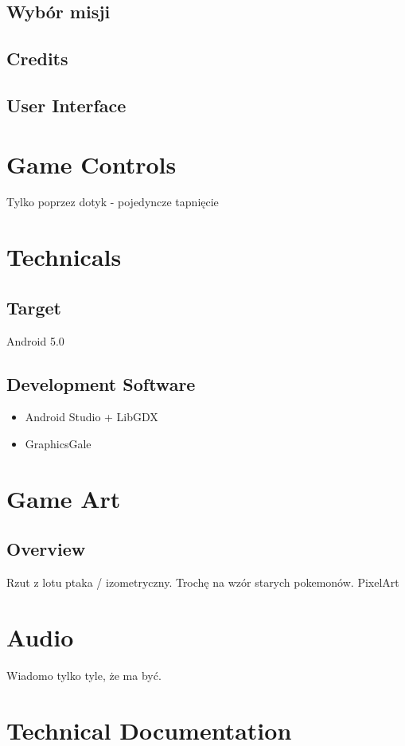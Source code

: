 \documentclass[12pt]{article}
\begin{document}
\subsection{Wybór misji}
\subsection{Credits}
\subsection{User Interface}

\newpage
\section{Game Controls}
Tylko poprzez dotyk - pojedyncze tapnięcie 

\newpage
\section{Technicals}
\subsection{Target}
Android 5.0
\subsection{Development Software}
	\begin{itemize}
	\item Android Studio + LibGDX
	\item GraphicsGale
	\end{itemize}


\newpage
\section{Game Art}
\subsection{Overview}
Rzut z lotu ptaka / izometryczny. Trochę na wzór starych pokemonów. PixelArt

\section{Audio}
Wiadomo tylko tyle, że ma być.

\newpage

\section{Technical Documentation}
\end{document}
